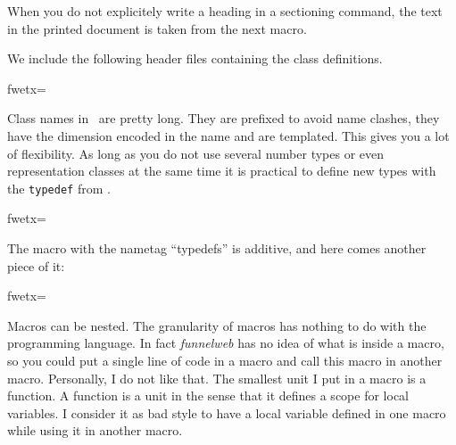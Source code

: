 \documentclass[]{article}
\begin{document}

When you do not explicitely write a heading in a sectioning command,
the text in the printed document is taken from the next macro.

\smallskip
{\sf We include the following header files containing the class definitions.}

\fwbeginmacro
{}\fwequals \fwodef {}fwetx=%
\fwcdef 
\fwbeginmacronotes
{}
\fwendmacronotes
\fwendmacro



{\sf Class names in \cgal\ are pretty long. They are prefixed to avoid
name clashes, they have the dimension encoded in the name and are
templated. This gives you a lot of flexibility. As long as you do not
use several number types or even representation classes at the same time
it is practical to define new types with the {\tt typedef} from \CC.}

\fwbeginmacro
{}\fwplusequals \fwodef {}fwetx=%
\fwcdef 
\fwbeginmacronotes
{}
\fwendmacronotes
\fwendmacro


The macro with the nametag ``typedefs'' is additive, and here comes another
piece of it:

\fwbeginmacro
{}\fwplusequals \fwodef {}fwetx=%
\fwcdef 
\fwbeginmacronotes
{}
\fwendmacronotes
\fwendmacro




Macros can be nested. The granularity of macros has nothing to do with
the programming language. In fact {\em funnelweb} has no idea of what
is inside a macro, so you could put a single line of code in a macro and
call this macro in another macro. Personally, I do not like that. The
smallest unit I put in a macro is a function. A function is a unit in
the sense that it defines a scope for local variables. I consider it
as bad style to have a local variable defined in one macro while using
it in another macro.
\end{document}
